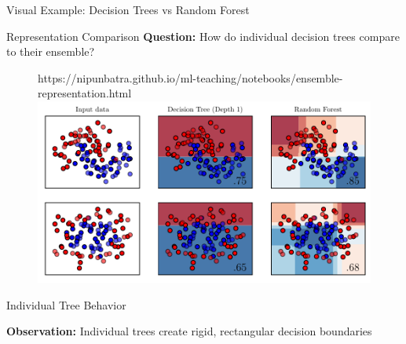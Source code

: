 \documentclass[10pt]{beamer}
\newcommand{\fitpic}[1]{\begin{adjustbox}{max width=\linewidth, max totalheight=0.78\textheight}#1\end{adjustbox}}
\begin{document}
\begin{frame}{Visual Example: Decision Trees vs Random Forest}
\begin{alertbox}{Representation Comparison}
\textbf{Question:} How do individual decision trees compare to their ensemble?
\end{alertbox}

\begin{figure}[htp]
  \centering
  \begin{notebookbox}{https://nipunbatra.github.io/ml-teaching/notebooks/ensemble-representation.html}
    \fitpic{\includegraphics[scale=0.5]{../assets/ensemble/figures/1-representation.pdf}}
  \end{notebookbox}
\end{figure}
\end{frame}

\begin{frame}{Individual Tree Behavior}
\begin{keypointsbox}
\textbf{Observation:} Individual trees create rigid, rectangular decision boundaries
\end{keypointsbox}
\end{frame}
\end{document}
